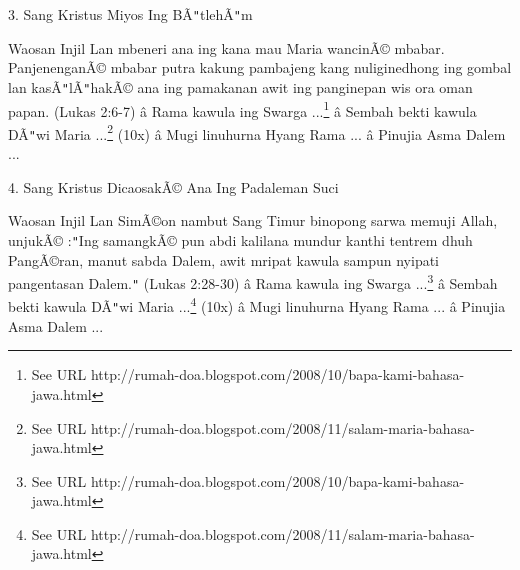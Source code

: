 
3. Sang Kristus Miyos Ing B\~A\texttt{{}"{}}tleh\~A\texttt{{}"{}}m

\newline


Waosan Injil
Lan mbeneri ana ing kana mau Maria wancin\~A\copyright{} mbabar. Panjenengan\~A\copyright{} mbabar putra kakung pambajeng kang nuliginedhong ing gombal lan kas\~A\texttt{{}"{}}l\~A\texttt{{}"{}}hak\~A\copyright{} ana ing pamakanan awit ing panginepan wis ora oman papan. (Lukas 2:6-7)
\newline
 \^a\*  Rama kawula ing Swarga ...\footnote{See URL http://rumah-doa.blogspot.com/2008/10/bapa-kami-bahasa-jawa.html}\newline
 \^a\*  Sembah bekti kawula D\~A\texttt{{}"{}}wi Maria ...\footnote{See URL http://rumah-doa.blogspot.com/2008/11/salam-maria-bahasa-jawa.html} (10x)\newline
 \^a\*  Mugi linuhurna Hyang Rama ...\newline
 \^a\*  Pinujia Asma Dalem ...\newline


4. Sang Kristus Dicaosak\~A\copyright{} Ana Ing Padaleman Suci

\newline


Waosan Injil
Lan Sim\~A\copyright{}on nambut Sang Timur binopong sarwa memuji Allah, unjuk\~A\copyright{} :\texttt{{}"{}}Ing samangk\~A\copyright{} pun abdi kalilana mundur kanthi tentrem dhuh Pang\~A\copyright{}ran, manut sabda Dalem, awit mripat kawula sampun nyipati pangentasan Dalem.\texttt{{}"{}}  (Lukas 2:28-30)
\newline
 \^a\*  Rama kawula ing Swarga ...\footnote{See URL http://rumah-doa.blogspot.com/2008/10/bapa-kami-bahasa-jawa.html}\newline
 \^a\*  Sembah bekti kawula D\~A\texttt{{}"{}}wi Maria ...\footnote{See URL http://rumah-doa.blogspot.com/2008/11/salam-maria-bahasa-jawa.html} (10x)\newline
 \^a\*  Mugi linuhurna Hyang Rama ...\newline
 \^a\*  Pinujia Asma Dalem ...\newline

